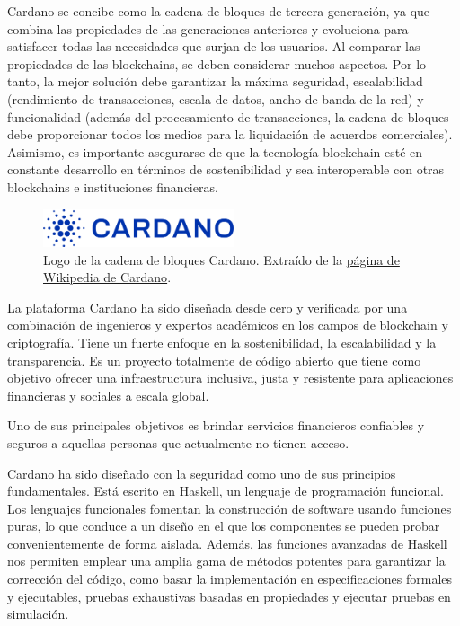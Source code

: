 \documentclass[12pt]{book}
\begin{document}
Cardano se concibe como la cadena de bloques de tercera generación, ya que combina las propiedades de las generaciones anteriores y evoluciona para satisfacer todas las necesidades que surjan de los usuarios. Al comparar las propiedades de las blockchains, se deben considerar muchos aspectos. Por lo tanto, la mejor solución debe garantizar la máxima seguridad, escalabilidad (rendimiento de transacciones, escala de datos, ancho de banda de la red) y funcionalidad (además del procesamiento de transacciones, la cadena de bloques debe proporcionar todos los medios para la liquidación de acuerdos comerciales). Asimismo, es importante asegurarse de que la tecnología blockchain esté en constante desarrollo en términos de sostenibilidad y sea interoperable con otras blockchains e instituciones financieras.

\begin{figure}[H]
	\centering
	\includegraphics[width=0.5\textwidth]{Cardano_logo.png}
	\caption{Logo de la cadena de bloques Cardano. Extraído de la \href{https://en.wikipedia.org/wiki/Cardano_(blockchain_platform)}{página de Wikipedia de Cardano}.}\label{fig:Cardano_logo}
\end{figure}


La plataforma Cardano ha sido diseñada desde cero y verificada por una combinación de ingenieros y expertos académicos en los campos de blockchain y criptografía.
Tiene un fuerte enfoque en la sostenibilidad, la escalabilidad y la transparencia.
Es un proyecto totalmente de código abierto que tiene como objetivo ofrecer una infraestructura inclusiva, justa y resistente para aplicaciones financieras y sociales a escala global.

Uno de sus principales objetivos es brindar servicios financieros confiables y seguros a aquellas personas que actualmente no tienen acceso.

Cardano ha sido diseñado con la seguridad como uno de sus principios fundamentales. Está escrito en Haskell, un lenguaje de programación funcional. Los lenguajes funcionales fomentan la construcción de software usando funciones puras, lo que conduce a un diseño en el que los componentes se pueden probar convenientemente de forma aislada. Además, las funciones avanzadas de Haskell nos permiten emplear una amplia gama de métodos potentes para garantizar la corrección del código, como basar la implementación en especificaciones formales y ejecutables, pruebas exhaustivas basadas en propiedades y ejecutar pruebas en simulación.
\end{document}
